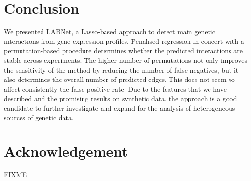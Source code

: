 \section{Conclusion} \label{conclusion}
We presented LABNet, a Lasso-based approach to detect main genetic interactions from gene expression profiles.  Penalised regression in concert with a permutation-based procedure determines whether the predicted interactions are stable across experiments. 
The higher number of permutations not only improves the sensitivity of the method by reducing the number of false negatives, but it also determines the overall number of predicted edges. This does not seem to affect consistently the false positive rate. Due to the features that we have described and the promising results on synthetic data, the approach is a good candidate to further investigate and expand for the analysis of heterogeneous sources of genetic data. 

\section*{Acknowledgement}
FIXME